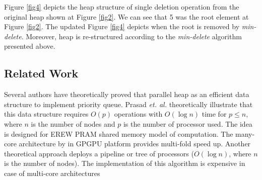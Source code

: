 \documentclass[10pt, conference, compsocconf]{IEEEtran}
\begin{document}
Figure \ref{fig4} depicts the heap structure of single deletion operation from the original heap shown at Figure \ref{fig2}. We can see that 5 was the root element at Figure \ref{fig2}.
The updated Figure \ref{fig4} depicts when the root is removed by {\it min-delete}.
Moreover, heap is re-structured according to the {\it min-delete} algorithm presented above.


\subsection{Related Work}
Several authors have theoretically proved that parallel heap as an efficient data structure to implement priority queue.
Prasad {\it et. al.} \cite{pq0,pq3} theoretically illustrate that this data structure requires $O(p)$ operations with $O(\log n)$ time for $p \leq n$, where $n$ is the number of nodes and $p$ is the number of processor used.
The idea is designed for EREW PRAM shared memory model of computation.
The many-core architecture by \cite{pq2} in GPGPU platform provides multi-fold speed up.
Another theoretical approach \cite{pq4} deploys a pipeline or tree of processors ($O(\log n)$, where $n$ is the number of nodes).
The implementation of this algorithm \cite{pq5} is expensive in case of multi-core architectures
\end{document}
